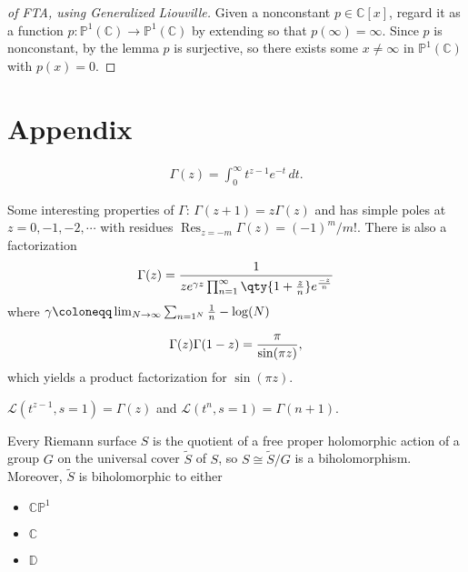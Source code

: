 \begin{proof}[of FTA, using Generalized Liouville]

Given a nonconstant \(p\in {\mathbb{C}}[x]\), regard it as a function
\(p: {\mathbb{P}}^1({\mathbb{C}}) \to {\mathbb{P}}^1({\mathbb{C}})\) by
extending so that \(p(\infty) = \infty\). Since \(p\) is nonconstant, by
the lemma \(p\) is surjective, so there exists some \(x\neq \infty\) in
\({\mathbb{P}}^1({\mathbb{C}})\) with \(p(x) = 0\).

\end{proof}

\hypertarget{appendix}{%
\section{Appendix}\label{appendix}}

\begin{definition}

\begin{align*}
\Gamma(z) = \int_0^\infty t^{z-1}e^{-t} \,dt
.\end{align*}

\end{definition}

\begin{remark}

Some interesting properties of \(\Gamma\): \(\Gamma(z+1) = z\Gamma(z)\)
and has simple poles at \(z=0,-1,-2,\cdots\) with residues
\(\mathop{\mathrm{Res}}_{z=-m} \Gamma(z) = (-1)^m/m!\). There is also a
factorization
\begin{align*}
\Gamma(z) = {1 \over ze^{\gamma z} \prod_{n=1}^\infty \qty{1 + {z\over n}}e^{-z\over n} }
\end{align*}
where
\(\gamma \coloneqq\lim_{N\to\infty } \sum_{n=1^N} {1\over n} - \log(N)\)

\begin{align*}
\Gamma(z) \Gamma(1-z) = {\pi \over \sin(\pi z)}
,\end{align*}
which yields a product factorization for \(\sin(\pi z)\).

\({\mathcal{L}}(t^{z-1}, s=1) = \Gamma(z)\) and
\({\mathcal{L}}(t^n, s=1) = \Gamma(n+1)\).

\end{remark}

\begin{theorem}[Uniformization]

Every Riemann surface \(S\) is the quotient of a free proper holomorphic
action of a group \(G\) on the universal cover \(\tilde S\) of \(S\), so
\(S\cong \tilde S/G\) is a biholomorphism. Moreover, \(\tilde S\) is
biholomorphic to either

\begin{itemize}
\tightlist
\item
  \({\mathbb{CP}}^1\)
\item
  \({\mathbb{C}}\)
\item
  \({\mathbb{D}}\)
\end{itemize}

\end{theorem}

